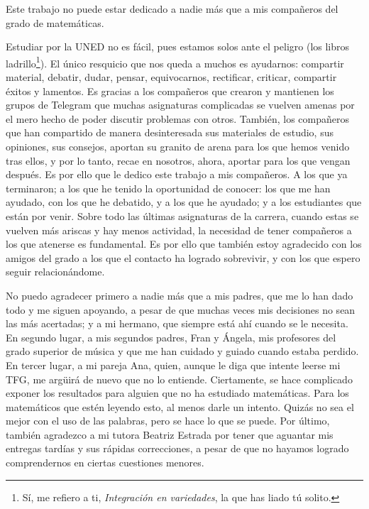 Este trabajo no puede estar dedicado a nadie más que a mis compañeros del grado de matemáticas.

Estudiar por la UNED no es fácil, pues estamos solos ante el peligro (los libros ladrillo\footnote{Sí, me refiero a ti, \textit{Integración en variedades}, la que has liado tú solito.}). El único resquicio que nos queda a muchos es ayudarnos: compartir material, debatir, dudar, pensar, equivocarnos, rectificar, criticar, compartir éxitos y lamentos. Es gracias a los compañeros que crearon y mantienen los grupos de Telegram que muchas asignaturas complicadas se vuelven amenas por el mero hecho de poder discutir problemas con otros. También, los compañeros que han compartido de manera desinteresada sus materiales de estudio, sus opiniones, sus consejos, aportan su granito de arena para los que hemos venido tras ellos, y por lo tanto, recae en nosotros, ahora, aportar para los que vengan después. Es por ello que le dedico este trabajo a mis compañeros. A los que ya terminaron; a los que he tenido la oportunidad de conocer: los que me han ayudado, con los que he debatido, y a los que he ayudado; y a los estudiantes que están por venir. Sobre todo las últimas asignaturas de la carrera, cuando estas se vuelven más ariscas y hay menos actividad, la necesidad de tener compañeros a los que atenerse es fundamental. Es por ello que también estoy agradecido con los amigos del grado a los que el contacto ha logrado sobrevivir, y con los que espero seguir relacionándome.

\medskip

No puedo agradecer primero a nadie más que a mis padres, que me lo han dado todo y me siguen apoyando, a pesar de que muchas veces mis decisiones no sean las más acertadas; y a mi hermano, que siempre está ahí cuando se le necesita. En segundo lugar, a mis segundos padres, Fran y Ángela, mis profesores del grado superior de música y que me han cuidado y guiado cuando estaba perdido. En tercer lugar, a mi pareja Ana, quien, aunque le diga que intente leerse mi TFG, me argüirá de nuevo que no lo entiende. Ciertamente, se hace complicado exponer los resultados para alguien que no ha estudiado matemáticas. Para los matemáticos que estén leyendo esto, al menos darle un intento. Quizás no sea el mejor con el uso de las palabras, pero se hace lo que se puede. Por último, también agradezco a mi tutora Beatriz Estrada por tener que aguantar mis entregas tardías y sus rápidas correcciones, a pesar de que no hayamos logrado comprendernos en ciertas cuestiones menores.

